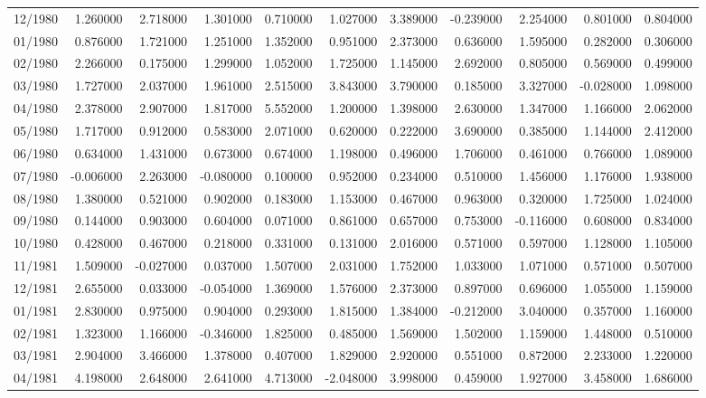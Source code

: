 \begin{tabular}{lrrrrrrrrrr}
12/1980 & 1.260000 & 2.718000 & 1.301000 & 0.710000 & 1.027000 & 3.389000 & -0.239000 & 2.254000 & 0.801000 & 0.804000 \\
01/1980 & 0.876000 & 1.721000 & 1.251000 & 1.352000 & 0.951000 & 2.373000 & 0.636000 & 1.595000 & 0.282000 & 0.306000 \\
02/1980 & 2.266000 & 0.175000 & 1.299000 & 1.052000 & 1.725000 & 1.145000 & 2.692000 & 0.805000 & 0.569000 & 0.499000 \\
03/1980 & 1.727000 & 2.037000 & 1.961000 & 2.515000 & 3.843000 & 3.790000 & 0.185000 & 3.327000 & -0.028000 & 1.098000 \\
04/1980 & 2.378000 & 2.907000 & 1.817000 & 5.552000 & 1.200000 & 1.398000 & 2.630000 & 1.347000 & 1.166000 & 2.062000 \\
05/1980 & 1.717000 & 0.912000 & 0.583000 & 2.071000 & 0.620000 & 0.222000 & 3.690000 & 0.385000 & 1.144000 & 2.412000 \\
06/1980 & 0.634000 & 1.431000 & 0.673000 & 0.674000 & 1.198000 & 0.496000 & 1.706000 & 0.461000 & 0.766000 & 1.089000 \\
07/1980 & -0.006000 & 2.263000 & -0.080000 & 0.100000 & 0.952000 & 0.234000 & 0.510000 & 1.456000 & 1.176000 & 1.938000 \\
08/1980 & 1.380000 & 0.521000 & 0.902000 & 0.183000 & 1.153000 & 0.467000 & 0.963000 & 0.320000 & 1.725000 & 1.024000 \\
09/1980 & 0.144000 & 0.903000 & 0.604000 & 0.071000 & 0.861000 & 0.657000 & 0.753000 & -0.116000 & 0.608000 & 0.834000 \\
10/1980 & 0.428000 & 0.467000 & 0.218000 & 0.331000 & 0.131000 & 2.016000 & 0.571000 & 0.597000 & 1.128000 & 1.105000 \\
11/1981 & 1.509000 & -0.027000 & 0.037000 & 1.507000 & 2.031000 & 1.752000 & 1.033000 & 1.071000 & 0.571000 & 0.507000 \\
12/1981 & 2.655000 & 0.033000 & -0.054000 & 1.369000 & 1.576000 & 2.373000 & 0.897000 & 0.696000 & 1.055000 & 1.159000 \\
01/1981 & 2.830000 & 0.975000 & 0.904000 & 0.293000 & 1.815000 & 1.384000 & -0.212000 & 3.040000 & 0.357000 & 1.160000 \\
02/1981 & 1.323000 & 1.166000 & -0.346000 & 1.825000 & 0.485000 & 1.569000 & 1.502000 & 1.159000 & 1.448000 & 0.510000 \\
03/1981 & 2.904000 & 3.466000 & 1.378000 & 0.407000 & 1.829000 & 2.920000 & 0.551000 & 0.872000 & 2.233000 & 1.220000 \\
04/1981 & 4.198000 & 2.648000 & 2.641000 & 4.713000 & -2.048000 & 3.998000 & 0.459000 & 1.927000 & 3.458000 & 1.686000 \\

\end{tabular}
